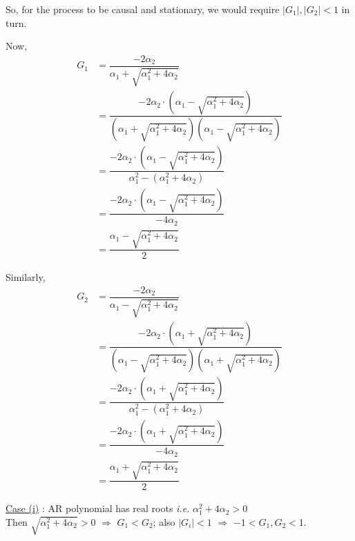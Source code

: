 \documentclass[11pt, a4paper]{article}
\numberwithin{equation}{section}
\theoremstyle{definition}
\begin{document}
So, for the process to be causal and stationary, we would require $|G_1|, |G_2| < 1$ in turn.\\[0.75em]

\begin{minipage}{0.45\textwidth}
Now,
\begin{align*}
G_1 &= \dfrac{-2\alpha_2}{\alpha_1 + \sqrt{\alpha_1^2 + 4\alpha_2}} \\[0.5em]
&= \dfrac{-2\alpha_2 \cdot \left(\alpha_1 - \sqrt{\alpha_1^2 + 4\alpha_2}\right)}{\left(\alpha_1 + \sqrt{\alpha_1^2 + 4\alpha_2}\right)\left(\alpha_1 - \sqrt{\alpha_1^2 + 4\alpha_2}\right)} \\[0.5em]
&= \dfrac{-2\alpha_2 \cdot \left(\alpha_1 - \sqrt{\alpha_1^2 + 4\alpha_2}\right)}{\alpha_1^2 - \left(\alpha_1^2 + 4 \alpha_2\right)} \\[0.5em]
&= \dfrac{-2\alpha_2 \cdot \left(\alpha_1 - \sqrt{\alpha_1^2 + 4\alpha_2}\right)}{- 4 \alpha_2} \\[0.5em]
&= \dfrac{\alpha_1 - \sqrt{\alpha_1^2 + 4\alpha_2}}{2}
\end{align*}
\end{minipage}
\hfill
\begin{minipage}{0.5\textwidth}
Similarly,
\begin{align*}
G_2 &= \dfrac{-2\alpha_2}{\alpha_1 - \sqrt{\alpha_1^2 + 4\alpha_2}} \\[0.5em]
&= \dfrac{-2\alpha_2 \cdot \left(\alpha_1 + \sqrt{\alpha_1^2 + 4\alpha_2}\right)}{\left(\alpha_1 - \sqrt{\alpha_1^2 + 4\alpha_2}\right)\left(\alpha_1 + \sqrt{\alpha_1^2 + 4\alpha_2}\right)} \\[0.5em]
&= \dfrac{-2\alpha_2 \cdot \left(\alpha_1 + \sqrt{\alpha_1^2 + 4\alpha_2}\right)}{\alpha_1^2 - \left(\alpha_1^2 + 4 \alpha_2\right)} \\[0.5em]
&= \dfrac{-2\alpha_2 \cdot \left(\alpha_1 + \sqrt{\alpha_1^2 + 4\alpha_2}\right)}{- 4 \alpha_2} \\[0.5em]
&= \dfrac{\alpha_1 + \sqrt{\alpha_1^2 + 4\alpha_2}}{2}
\end{align*}
\end{minipage}

\vspace{0.5cm}

\underline{Case (i)} : AR polynomial has real roots \textit{i.e.} $\alpha_1^2 + 4\alpha_2 > 0$ \\[0.75em]

Then $\sqrt{\alpha_1^2 + 4\alpha_2} > 0$ $\Rightarrow$ $G_1 < G_2$; also $|G_i| < 1$ $\Rightarrow$ $-1 < G_1, G_2 < 1$.\\[0.1em]
\end{document}
